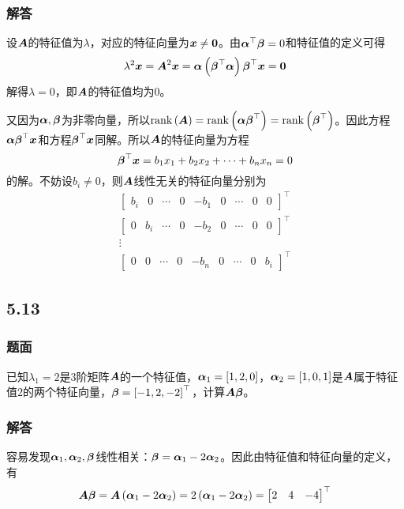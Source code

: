 \documentclass[9pt,xcolor=svgnames]{beamer} %
\begin{document}
\begin{frame}[allowframebreaks]
    \frametitle{解答}

    设\(\boldsymbol{A}\)的特征值为\(\lambda\)，对应的特征向量为\(\boldsymbol{x}\neq\boldsymbol{0}\)。由\(\boldsymbol{\alpha}^\top\boldsymbol{\beta}=0\)和特征值的定义可得
    \begin{equation*}
        \lambda^2\boldsymbol{x}=\boldsymbol{A}^2\boldsymbol{x}=\boldsymbol{\alpha}\left( \boldsymbol{\beta}^\top\boldsymbol{\alpha} \right)\boldsymbol{\beta}^\top\boldsymbol{x}=\boldsymbol{0}
    \end{equation*}
    解得\(\lambda=0\)，即\(\boldsymbol{A}\)的特征值均为\(0\)。

    又因为\(\boldsymbol{\alpha},\boldsymbol{\beta}\)为非零向量，所以\(\mathrm{rank}\left( \boldsymbol{A} \right)=\mathrm{rank}\left( \boldsymbol{\alpha}\boldsymbol{\beta}^\top \right)=\mathrm{rank}\left( \boldsymbol{\beta}^\top \right)\)。因此方程\(\boldsymbol{\alpha}\boldsymbol{\beta}^\top\boldsymbol{x}\)和方程\(\boldsymbol{\beta}^\top\boldsymbol{x}\)同解。所以\(\boldsymbol{A}\)的特征向量为方程
    \begin{equation*}
        \boldsymbol{\beta}^\top\boldsymbol{x}=b_1x_1+b_2x_2+\dots+b_nx_n=0
    \end{equation*}
    的解。不妨设\(b_i\neq0\)，则\(\boldsymbol{A}\)线性无关的特征向量分别为
    \begin{gather*}
        \begin{bmatrix}b_i&0&\cdots&0&-b_1&0&\cdots&0&0\end{bmatrix}^\top\\
        \begin{bmatrix}0&b_i&\cdots&0&-b_2&0&\cdots&0&0\end{bmatrix}^\top\\
        \vdots\\
        \begin{bmatrix}0&0&\cdots&0&-b_n&0&\cdots&0&b_i\end{bmatrix}^\top
    \end{gather*}

\end{frame}

\subsection*{5.13}
\begin{frame}
    \frametitle{题面}
    已知\(\lambda_1=2\)是\(3\)阶矩阵\(\boldsymbol{A}\)的一个特征值，\(\boldsymbol{\alpha}_1=\left[ 1,2,0 \right]\)，\(\boldsymbol{\alpha}_2=\left[ 1,0,1 \right]\)是\(\boldsymbol{A}\)属于特征值\(2\)的两个特征向量，\(\boldsymbol{\beta}=\left[ -1,2,-2 \right]^\top\)，计算\(\boldsymbol{A}\boldsymbol{\beta}\)。
\end{frame}

\begin{frame}
    \frametitle{解答}
    容易发现\(\boldsymbol{\alpha}_1,\boldsymbol{\alpha}_2,\boldsymbol{\beta}\)线性相关：\(\boldsymbol{\beta}=\boldsymbol{\alpha}_1-2\boldsymbol{\alpha}_2\)。因此由特征值和特征向量的定义，有
    \begin{equation*}
        \boldsymbol{A}\boldsymbol{\beta}=\boldsymbol{A}\left( \boldsymbol{\alpha}_1-2\boldsymbol{\alpha}_2 \right)=2\left( \boldsymbol{\alpha}_1-2\boldsymbol{\alpha}_2 \right)=\begin{bmatrix}2&4&-4\end{bmatrix}^\top
    \end{equation*}
\end{frame}
\end{document}
